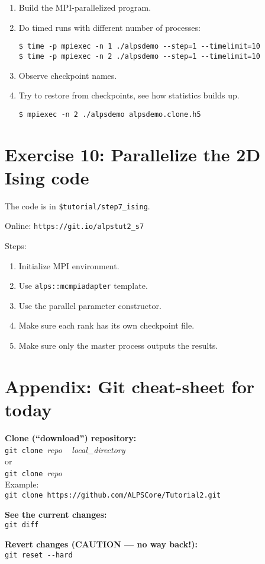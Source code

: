 \documentclass[12pt]{article}
\newcommand{\code}[1]{\texttt{#1}}
\begin{document}
\begin{enumerate}
\item Build the MPI-parallelized program.
\item Do timed runs with different number of processes:
  \begin{lstlisting}[emph={mpiexec}]
$ time -p mpiexec -n 1 ./alpsdemo --step=1 --timelimit=10
$ time -p mpiexec -n 2 ./alpsdemo --step=1 --timelimit=10
  \end{lstlisting} %
\item Observe checkpoint names.
\item Try to restore from checkpoints, see how statistics builds up.
  \begin{lstlisting}[emph={mpiexec}]
$ mpiexec -n 2 ./alpsdemo alpsdemo.clone.h5
\end{lstlisting} %
\end{enumerate}

\pagebreak
\section*{Exercise 10: Parallelize the 2D Ising code}

The code is in \texttt{\color{ballblue}\$tutorial/step7\_ising}.

Online: \nolinkurl{https://git.io/alpstut2_s7}

Steps: 
\begin{enumerate}
\item Initialize MPI environment.
\item Use \code{alps::mcmpiadapter} template.
\item Use the parallel parameter constructor.
\item Make sure each rank has its own checkpoint file.
\item Make sure only the master process outputs the results.
\end{enumerate}


\pagebreak
\section*{Appendix: Git cheat-sheet for today}
\begin{flushleft}
\textbf{Clone (``download'') repository:}\\
\lstinline[style=showspaces]|git clone |\emph{repo}%
\lstinline[style=showspaces]| |%
\emph{local\_directory}\\
or \\
\lstinline[style=showspaces]|git clone |\emph{repo}\\
Example: \\
\lstinline[style=showspaces]|git clone https://github.com/ALPSCore/Tutorial2.git|

\textbf{See the current changes:}\\
\lstinline[style=showspaces]{git diff}

\textbf{Revert changes (CAUTION --- no way back!):}\\
\lstinline[style=showspaces]|git reset --hard|
\end{flushleft}
\end{document}
